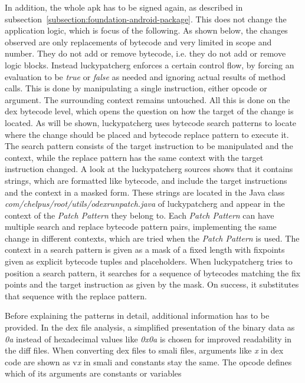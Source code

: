 In addition, the whole \gls{apk} has to be signed again, as described in subsection~\ref{subsection:foundation-android-package}.
This does not change the application logic, which is focus of the following.
\newline
\newline
As shown below, the changes observed are only replacements of bytecode and very limited in scope and number.
They do not add or remove bytecode, i.e. they do not add or remove logic blocks.
Instead \gls{luckypatcherg} enforces a certain control flow, by forcing an evaluation to be \textit{true} or \textit{false} as needed and ignoring actual results of method calls.
This is done by manipulating a single instruction, either opcode or argument.
The surrounding context remains untouched.
\newline
All this is done on the dex bytecode level, which opens the question on how the target of the change is located.
As will be shown, \gls{luckypatcherg} uses bytecode search patterns to locate where the change should be placed and bytecode replace pattern to execute it.
The search pattern consists of the target instruction to be manipulated and the context, while the replace pattern has the same context with the target instruction changed.
\newline
A look at the \gls{luckypatcherg} sources shows that it contains strings, which are formatted like bytecode, and include the target instructions and the context in a masked form.
These strings are located in the Java class \textit{com/chelpus/root/utils/odexrunpatch.java} of \gls{luckypatcherg} and appear in the context of the \textit{Patch Pattern} they belong to.
Each \textit{Patch Pattern} can have multiple search and replace bytecode pattern pairs, implementing the same change in different contexts, which are tried when the \textit{Patch Pattern} is used.
\newline
The context in a search pattern is given as a mask of a fixed length with fixpoints given as explicit bytecode tuples and placeholders.
When \gls{luckypatcherg} tries to position a search pattern, it searches for a sequence of bytecodes matching the fix points and the target instruction as given by the mask.
On success, it substitutes that sequence with the replace pattern.
\newline
\newline

Before explaining the patterns in detail, additional information has to be provided.
In the \gls{dex} file analysis, a simplified presentation of the binary data as \textit{0a} instead of hexadecimal values like \textit{0x0a} is chosen for improved readability in the diff files.
When converting \gls{dex} files to smali files, arguments like \textit{x} in dex code are shown as  v\textit{x} in smali and constants stay the same.
The opcode defines which of its arguments are constants or variables

